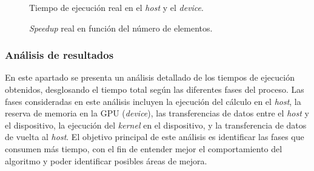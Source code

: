\documentclass{article}
\begin{document}
			\begin{figure}
				\centering
				\caption{Tiempo de ejecución real en el \textit{host} y el \textit{device}.}
				\label{fig:device_vs_host_time_4}
			\end{figure}

			\begin{figure}
				\centering
				\caption{\textit{Speedup} real en función del número de elementos.}
				\label{fig:speedup_vs_elements_4}
			\end{figure}

		\subsubsection{Análisis de resultados}

			En este apartado se presenta un análisis detallado de los tiempos de ejecución obtenidos, desglosando el tiempo total según las diferentes fases del proceso. Las fases consideradas en este análisis incluyen la ejecución del cálculo en el \textit{host}, la reserva de memoria en la GPU (\textit{device}), las transferencias de datos entre el \textit{host} y el dispositivo, la ejecución del \textit{kernel} en el dispositivo, y la transferencia de datos de vuelta al \textit{host}. El objetivo principal de este análisis es identificar las fases que consumen más tiempo, con el fin de entender mejor el comportamiento del algoritmo y poder identificar posibles áreas de mejora.
\end{document}
